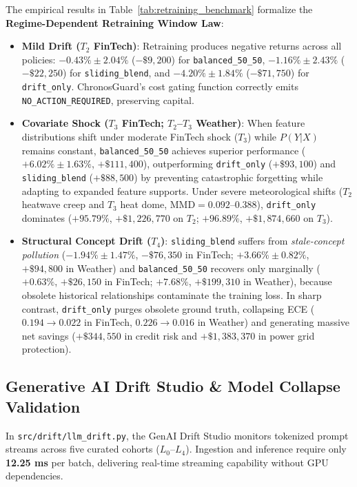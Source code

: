 \documentclass[conference]{IEEEtran}
\begin{document}
The empirical results in Table~\ref{tab:retraining_benchmark} formalize the \textbf{Regime-Dependent Retraining Window Law}:
\begin{itemize}
    \item \textbf{Mild Drift ($T_2$ FinTech)}: Retraining produces negative returns across all policies: $-0.43\% \pm 2.04\%$ ($-\$9,200$) for \texttt{balanced\_50\_50}, $-1.16\% \pm 2.43\%$ ($-\$22,250$) for \texttt{sliding\_blend}, and $-4.20\% \pm 1.84\%$ ($-\$71,750$) for \texttt{drift\_only}. ChronosGuard's cost gating function correctly emits \texttt{NO\_ACTION\_REQUIRED}, preserving capital.
    \item \textbf{Covariate Shock ($T_3$ FinTech; $T_2$--$T_3$ Weather)}: When feature distributions shift under moderate FinTech shock ($T_3$) while $P(Y|X)$ remains constant, \texttt{balanced\_50\_50} achieves superior performance ($+6.02\% \pm 1.63\%$, $+\$111,400$), outperforming \texttt{drift\_only} ($+\$93,100$) and \texttt{sliding\_blend} ($+\$88,500$) by preventing catastrophic forgetting while adapting to expanded feature supports. Under severe meteorological shifts ($T_2$ heatwave creep and $T_3$ heat dome, $\text{MMD}=0.092\text{--}0.388$), \texttt{drift\_only} dominates ($+95.79\%$, $+\$1,226,770$ on $T_2$; $+96.89\%$, $+\$1,874,660$ on $T_3$).
    \item \textbf{Structural Concept Drift ($T_4$)}: \texttt{sliding\_blend} suffers from \textit{stale-concept pollution} ($-1.94\% \pm 1.47\%$, $-\$76,350$ in FinTech; $+3.66\% \pm 0.82\%$, $+\$94,800$ in Weather) and \texttt{balanced\_50\_50} recovers only marginally ($+0.63\%$, $+\$26,150$ in FinTech; $+7.68\%$, $+\$199,310$ in Weather), because obsolete historical relationships contaminate the training loss. In sharp contrast, \texttt{drift\_only} purges obsolete ground truth, collapsing ECE ($0.194 \to 0.022$ in FinTech, $0.226 \to 0.016$ in Weather) and generating massive net savings ($+\$344,550$ in credit risk and $+\$1,383,370$ in power grid protection).
\end{itemize}

\subsection{Generative AI Drift Studio \& Model Collapse Validation}
In \texttt{src/drift/llm\_drift.py}, the GenAI Drift Studio monitors tokenized prompt streams across five curated cohorts ($L_0$--$L_4$). Ingestion and inference require only \textbf{12.25 ms} per batch, delivering real-time streaming capability without GPU dependencies.
\end{document}
